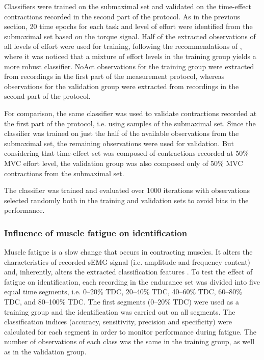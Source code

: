 Classifiers were trained on the submaximal set and validated on the time-effect contractions recorded in the second part of the protocol. As in the previous section, 20 time epochs for each task and level of effort were identified from the submaximal set based on the torque signal. Half of the extracted observations of all levels of effort were used for training, following the recommendations of \citet{Scheme2013}, where it was noticed that a mixture of effort levels in the training group yields a more robust classifier. NoAct observations for the training group were extracted from recordings in the first part of the measurement protocol, whereas observations for the validation group were extracted from recordings in the second part of the protocol.

For comparison, the same classifier was used to validate contractions recorded at the first part of the protocol, i.e. using samples of the submaximal set. Since the classifier was trained on just the half of the available observations from the submaximal set, the remaining observations were used for validation. But considering that time-effect set was composed of contractions recorded at 50\% MVC effort level, the validation group was also composed only of 50\% MVC contractions from the submaximal set.

The classifier was trained and evaluated over 1000 iterations with observations selected randomly both in the training and validation sets to avoid bias in the performance.



\subsubsection{Influence of muscle fatigue on identification}
Muscle fatigue is a slow change that occurs in contracting muscles. It alters the characteristics of recorded sEMG signal (i.e. amplitude and frequency content) \citep{DeLuca1984} and, inherently, alters the extracted classification features \citep{Wan2010}. To test the effect of fatigue on identification, each recording in the endurance set was divided into five equal time segments, i.e. 0–20\% TDC, 20–40\% TDC, 40–60\% TDC, 60–80\% TDC, and 80–100\% TDC. The first segments (0–20\% TDC) were used as a training group and the identification was carried out on all segments. The classification indices (accuracy, sensitivity, precision and specificity) were calculated for each segment in order to monitor performance during fatigue. The number of observations of each class was the same in the training group, as well as in the validation group.


